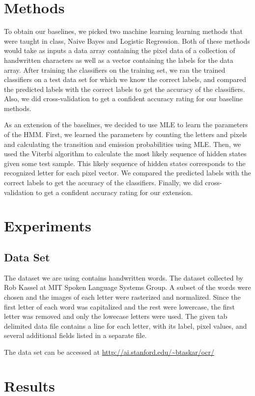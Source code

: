 \documentclass{article} %
\begin{document}
\section{Methods}
To obtain our baselines, we picked two machine learning learning methods that were taught in class, Naive Bayes and Logistic Regression. Both of these methods would take as inputs a data array containing the pixel data of a collection of handwritten characters as well as a vector containing the labels for the data array. After training the classifiers on the training set, we ran the trained classifiers on a test data set for which we know the correct labels, and compared the predicted labels with the correct labels to get the accuracy of the classifiers. Also, we did cross-validation to get a confident accuracy rating for our baseline methods. 

As an extension of the baselines, we decided to use MLE to learn the parameters of the HMM. First, we learned the parameters by counting the letters and pixels and calculating the transition and emission probabilities using MLE. Then, we used the Viterbi algorithm to calculate the most likely sequence of hidden states given some test sample. This likely sequence of hidden states corresponds to the recognized letter for each pixel vector. We compared the predicted labels with the correct labels to get the accuracy of the classifiers. Finally, we did cross-validation to get a confident accuracy rating for our extension. 

\section{Experiments}
\subsection{Data Set}
The dataset we are using contains handwritten words. The dataset collected by Rob Kassel at MIT Spoken Language Systems Group. A subset of the words were chosen and the images of each letter were rasterized and normalized. Since the first letter of each word was capitalized and the rest were lowercase, the first letter was removed and only the lowecase letters were used. The given tab delimited data file  contains a line for each letter, with its label, pixel values, and several additional fields listed in a separate file. 

The data set can be accessed at \url{http://ai.stanford.edu/~btaskar/ocr/}

\section{Results}
\end{document}
